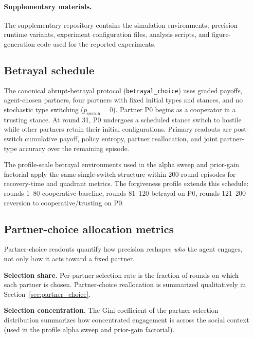 \paragraph{Supplementary materials.}
The supplementary repository contains the simulation environments, precision-runtime variants, experiment configuration files, analysis scripts, and figure-generation code used for the reported experiments.

\subsection{Betrayal schedule}

The canonical abrupt-betrayal protocol (\texttt{betrayal\_choice}) uses graded payoffs, agent-chosen partners, four partners with fixed initial types and stances, and no stochastic type switching ($p_{\mathrm{switch}}=0$). Partner P0 begins as a cooperator in a trusting stance. At round 31, P0 undergoes a scheduled stance switch to hostile while other partners retain their initial configurations. Primary readouts are post-switch cumulative payoff, policy entropy, partner reallocation, and joint partner-type accuracy over the remaining episode.

The profile-scale betrayal environments used in the alpha sweep and prior-gain factorial apply the same single-switch structure within 200-round episodes for recovery-time and quadrant metrics. The forgiveness profile extends this schedule: rounds 1--80 cooperative baseline, rounds 81--120 betrayal on P0, rounds 121--200 reversion to cooperative/trusting on P0.

\subsection{Partner-choice allocation metrics}

Partner-choice readouts quantify how precision reshapes \emph{who} the agent engages, not only how it acts toward a fixed partner.

\textbf{Selection share.} Per-partner selection rate is the fraction of rounds on which each partner is chosen. Partner-choice reallocation is summarized qualitatively in Section~\ref{sec:partner_choice}.

\textbf{Selection concentration.} The Gini coefficient of the partner-selection distribution summarizes how concentrated engagement is across the social context (used in the profile alpha sweep and prior-gain factorial).

